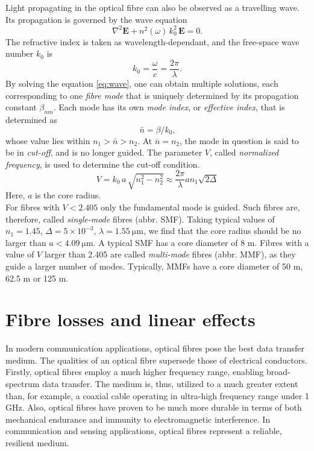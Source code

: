 \documentclass{standalone}
\begin{document}
Light propagating in the optical fibre can also be observed as a travelling wave. Its propagation is governed by the wave equation
\begin{equation} \label{eq:wave}
\nabla^2 \mathbf{E} + n^2(\omega) \, k_0^2 \, \mathbf{E} = 0 \textrm{.}
\end{equation}
The refractive index is taken as wavelength-dependant, and the free-space wave number $k_0$ is
\begin{equation}
k_0 = \frac{\omega}{c} = \frac{2 \pi}{\lambda} \textrm{.}
\end{equation}
By solving the equation \ref{eq:wave}, one can obtain multiple solutions, each corresponding to one \textit{fibre mode} that is uniquely determined by its propagation constant $\beta_{nm}$. Each mode has its own \textit{mode index}, or \textit{effective index}, that is determined as
\begin{equation}
\bar{n} = \beta/k_0 \textrm{,}
\end{equation}
whose value lies within $n_1 > \bar{n} > n_2$. At $\bar{n} = n_2$, the mode in question is said to be in \textit{cut-off}, and is no longer guided. The parameter $V$, called \textit{normalized frequency}, is used to determine the cut-off condition.
\begin{equation}
V = k_0 \, a \, \sqrt{n_1^2 - n_2^2} \approx \frac{2 \pi}{\lambda} a n_1 \sqrt{2 \varDelta}
\end{equation}
Here, $a$ is the core radius. \\

For fibres with $V < 2.405$ only the fundamental mode is guided. Such fibres are, therefore, called \textit{single-mode} fibres (abbr. SMF). Taking typical values of $n_1 = 1.45$, $\varDelta = 5 \times 10^{-3}$, $\lambda = \SI{1.55}{\micro \meter}$, we find that the core radius should be no larger than $a < \SI{4.09}{\micro \meter}$. A typical SMF has a core diameter of 8 \textmu m. Fibres with a value of $V$ larger than 2.405 are called \textit{multi-mode} fibres (abbr. MMF), as they guide a larger number of modes. Typically, MMFs have a core diameter of 50 \textmu m, 62.5 \textmu m or 125 \textmu m.


\section{Fibre losses and linear effects}

In modern communication applications, optical fibres pose the best data transfer medium. The qualities of an optical fibre supersede those of electrical conductors. Firstly, optical fibres employ a much higher frequency range, enabling broad-spectrum data transfer. The medium is, thus, utilized to a much greater extent than, for example, a coaxial cable operating in ultra-high frequency range under 1 GHz. Also, optical fibres have proven to be much more durable in terms of both mechanical endurance and immunity to electromagnetic interference. In communication and sensing applications, optical fibres represent a reliable, resilient medium. \\
\end{document}
